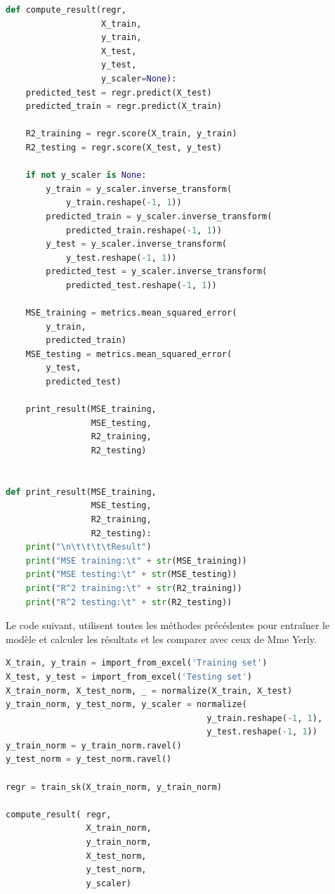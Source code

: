\begin{lstlisting}[language=Python]
def compute_result(regr,
                   X_train,
                   y_train,
                   X_test,
                   y_test,
                   y_scaler=None):
    predicted_test = regr.predict(X_test)
    predicted_train = regr.predict(X_train)

    R2_training = regr.score(X_train, y_train)
    R2_testing = regr.score(X_test, y_test)

    if not y_scaler is None:
        y_train = y_scaler.inverse_transform(
            y_train.reshape(-1, 1))
        predicted_train = y_scaler.inverse_transform(
            predicted_train.reshape(-1, 1))
        y_test = y_scaler.inverse_transform(
            y_test.reshape(-1, 1))
        predicted_test = y_scaler.inverse_transform(
            predicted_test.reshape(-1, 1))

    MSE_training = metrics.mean_squared_error(
        y_train,
        predicted_train)
    MSE_testing = metrics.mean_squared_error(
        y_test,
        predicted_test)

    print_result(MSE_training,
                 MSE_testing,
                 R2_training,
                 R2_testing)


def print_result(MSE_training,
                 MSE_testing,
                 R2_training,
                 R2_testing):
    print("\n\t\t\t\tResult")
    print("MSE training:\t" + str(MSE_training))
    print("MSE testing:\t" + str(MSE_testing))
    print("R^2 training:\t" + str(R2_training))
    print("R^2 testing:\t" + str(R2_testing))
\end{lstlisting}

Le code suivant, utilisent toutes les méthodes précédentes pour entraîner le modèle et calculer les résultats et les comparer avec ceux de Mme Yerly.
\begin{lstlisting}[language=Python]
X_train, y_train = import_from_excel('Training set')
X_test, y_test = import_from_excel('Testing set')
X_train_norm, X_test_norm, _ = normalize(X_train, X_test)
y_train_norm, y_test_norm, y_scaler = normalize(
                                        y_train.reshape(-1, 1),
                                        y_test.reshape(-1, 1))
y_train_norm = y_train_norm.ravel()
y_test_norm = y_test_norm.ravel()

regr = train_sk(X_train_norm, y_train_norm)

compute_result( regr,
                X_train_norm,
                y_train_norm,
                X_test_norm,
                y_test_norm,
                y_scaler)
\end{lstlisting}


